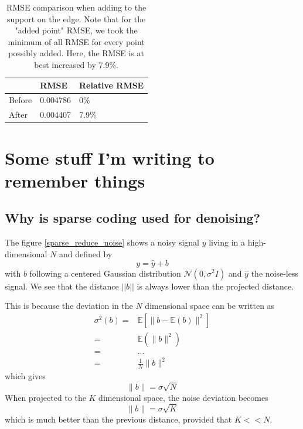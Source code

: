 \begin{table}[!h]\centering
\begin{tabular}{@{}lll@{}}\toprule
 & RMSE & Relative RMSE \\ \midrule
Before & 0.004786 & 0\% \\
After & 0.004407 & 7.9\% \\ \bottomrule
\end{tabular}
\caption{RMSE comparison when adding to the support on the  edge. Note that for the "added point" RMSE, we took the minimum of all RMSE for every point possibly added. Here, the RMSE is at best increased by 7.9\%.}
\end{table}



\clearpage
{}
\appendix

\chapter{Some stuff I'm writing to remember things}

\section{Why is sparse coding used for denoising?}

The figure \ref{sparse_reduce_noise} shows a noisy signal $y$ living in a high-dimensional $N$ and defined by
$$y=\hat{y} + b$$
with $b$ following a centered Gaussian distribution $\mathcal{N}(0,\sigma^2I)$ and $\hat{y}$ the noise-less signal. We see that the distance $||b||$ is always lower than the projected distance.

This is because the deviation in the $N$ dimensional space can be written as
\begin{align*}
\sigma^2(b) =& \mathbb{E}\left[\lVert b-\mathbb{E}(b) \rVert^2 \right]\\
=& \mathbb{E}\left(\lVert b \rVert^2 \right)\\
=& ... \\
=& \frac{1}{N}\lVert b \rVert^2
\end{align*}
which gives 
$$ \lVert b \rVert = \sigma\sqrt{N} $$
When projected to the $K$ dimensional space, the noise deviation becomes
$$\lVert b \rVert = \sigma\sqrt{K} $$
which is much better than the previous distance, provided that $K<<N$. 

